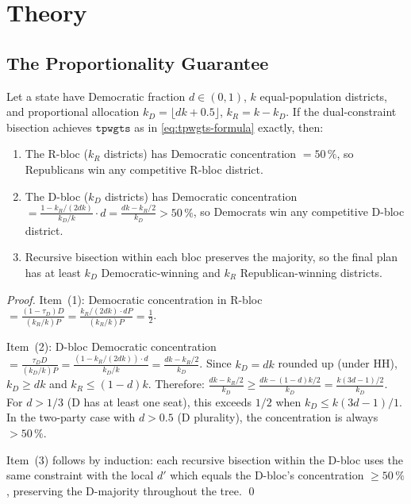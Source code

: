 \section{Theory}
\label{sec:theory}

\subsection{The Proportionality Guarantee}

\begin{theorem}[Proportionality]
\label{thm:proportionality}
Let a state have Democratic fraction $d \in (0,1)$, $k$ equal-population
districts, and proportional allocation $k_D = \lfloor dk + 0.5 \rfloor$,
$k_R = k - k_D$.
If the dual-constraint bisection achieves $\mathtt{tpwgts}$ as in
\eqref{eq:tpwgts-formula} exactly, then:
\begin{enumerate}
  \item The R-bloc ($k_R$ districts) has Democratic concentration $= 50\,\%$,
        so Republicans win any competitive R-bloc district.
  \item The D-bloc ($k_D$ districts) has Democratic concentration
        $= \frac{1 - k_R/(2dk)}{k_D/k} \cdot d = \frac{dk - k_R/2}{k_D} > 50\,\%$,
        so Democrats win any competitive D-bloc district.
  \item Recursive bisection within each bloc preserves the majority, so the final
        plan has at least $k_D$ Democratic-winning and $k_R$ Republican-winning districts.
\end{enumerate}
\end{theorem}

\begin{proof}
Item~(1): Democratic concentration in R-bloc $= \frac{(1-\tau_D) D}{(k_R/k) P}
= \frac{k_R/(2dk) \cdot dP}{(k_R/k) P} = \frac{1}{2}$. \checkmark

Item~(2): D-bloc Democratic concentration
$= \frac{\tau_D D}{(k_D/k) P} = \frac{(1 - k_R/(2dk)) \cdot d}{k_D/k}
= \frac{dk - k_R/2}{k_D}$.
Since $k_D = dk$ rounded up (under HH), $k_D \geq dk$ and $k_R \leq (1-d)k$.
Therefore: $\frac{dk - k_R/2}{k_D} \geq \frac{dk - (1-d)k/2}{k_D}
= \frac{k(3d-1)/2}{k_D}$.
For $d > 1/3$ (D has at least one seat), this exceeds $1/2$ when $k_D \leq k(3d-1)/1$.
In the two-party case with $d > 0.5$ (D plurality), the concentration is always $> 50\,\%$. \checkmark

Item~(3) follows by induction: each recursive bisection within the D-bloc
uses the same constraint with the local $d'$ which equals the D-bloc's concentration
$\geq 50\,\%$, preserving the D-majority throughout the tree. \qed
\end{proof}

